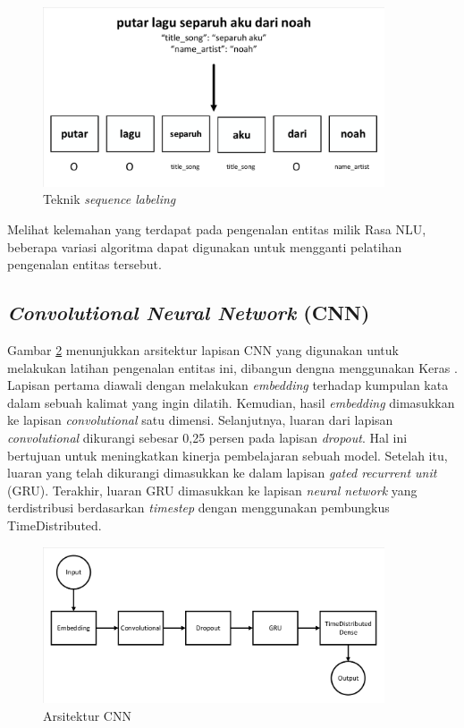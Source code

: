 \begin{figure}[H]
	\centering
	\includegraphics[width=0.9\textwidth, trim=2 2 2 2, clip]{resources/3/sequence_labeling.pdf}
	\caption{Teknik \textit{sequence labeling}}
	\label{fig:sequence_labeling}
\end{figure}

Melihat kelemahan yang terdapat pada pengenalan entitas milik Rasa NLU, beberapa variasi algoritma dapat digunakan untuk mengganti pelatihan pengenalan entitas tersebut.

\subsection{\textit{Convolutional Neural Network} (CNN)}

Gambar \ref{fig:cnn} menunjukkan arsitektur lapisan CNN yang digunakan untuk melakukan latihan pengenalan entitas ini, dibangun dengna menggunakan Keras \parencite{sasank2017spoken}. Lapisan pertama diawali dengan melakukan \textit{embedding} terhadap kumpulan kata dalam sebuah kalimat yang ingin dilatih. Kemudian, hasil \textit{embedding} dimasukkan ke lapisan \textit{convolutional} satu dimensi. Selanjutnya, luaran dari lapisan \textit{convolutional} dikurangi sebesar 0,25 persen pada lapisan \textit{dropout}. Hal ini bertujuan untuk meningkatkan kinerja pembelajaran sebuah model. Setelah itu, luaran yang telah dikurangi dimasukkan ke dalam lapisan \textit{gated recurrent unit} (GRU). Terakhir, luaran GRU dimasukkan ke lapisan \textit{neural network} yang terdistribusi berdasarkan \textit{timestep} dengan menggunakan pembungkus TimeDistributed.

\begin{figure}[H]
	\centering
	\includegraphics[width=0.9\textwidth, trim=2 2 2 2, clip]{resources/3/cnn.pdf}
	\caption{Arsitektur CNN \parencite{sasank2017spoken}}
	\label{fig:cnn}
\end{figure}

